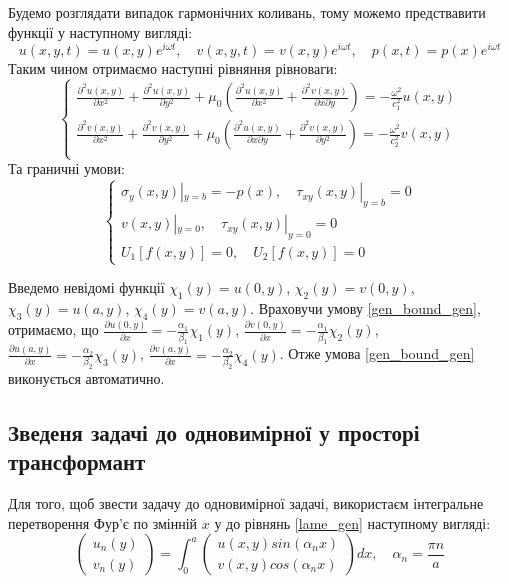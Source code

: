 Будемо розглядати випадок гармонічних коливань, тому можемо предствавити функції у наступному вигляді:
\begin{equation}
    u(x,y,t) = u(x,y) e^{i \omega t}, \quad v(x,y,t) = v(x,y) e^{i \omega t}, \quad p(x,t) = p(x) e^{i \omega t}
\end{equation}
Таким чином отримаємо наступні рівняння рівноваги:
\begin{equation}\label{lame_gen}
    \begin{cases}
        \frac{\partial^2 u(x,y)}{\partial x^2} + \frac{\partial^2 u(x,y)}{\partial y^2} + \mu_0 (\frac{\partial^2 u(x,y)}{\partial x^2} + \frac{\partial^2 v(x,y)}{\partial x\partial y}) = -\frac{\omega^2}{c_1^2}  u(x,y) \\
        \frac{\partial^2 v(x,y)}{\partial x^2} + \frac{\partial^2 v(x,y)}{\partial y^2} + \mu_0 (\frac{\partial^2 u(x,y)}{\partial x \partial y} + \frac{\partial^2 v(x,y)}{\partial y^2}) = -\frac{\omega^2}{c_2^2} v(x,y) \\
    \end{cases}
\end{equation}
Та граничні умови:
\begin{equation}\label{bound_gen}
    \begin{cases}
        \sigma_y(x, y) |_{y=b} = -p(x), \quad  \tau_{xy}(x,y) |_{y=b} =0 \\
        v(x,y) |_{y=0}, \quad \tau_{xy}(x,y) |_{y=0} =0 \\
        U_1[f(x,y)]=0, \quad U_2[f(x,y)]=0
    \end{cases}
\end{equation}

Введемо невідомі функції $\chi_1(y) = u(0, y)$, $\chi_2(y) = v(0, y)$, $\chi_3(y) = u(a, y)$, $\chi_4(y) = v(a, y)$.
Враховучи умову \eqref{gen_bound_gen}, отримаємо, що 
$\frac{\partial u(0, y)}{\partial x}=-\frac{\alpha_1}{\beta_1} \chi_1(y)$,
$\frac{\partial v(0, y)}{\partial x}=-\frac{\alpha_1}{\beta_1} \chi_2(y)$,
$\frac{\partial u(a, y)}{\partial x}=-\frac{\alpha_2}{\beta_2} \chi_3(y)$,
$\frac{\partial v(a, y)}{\partial x}=-\frac{\alpha_2}{\beta_2} \chi_4(y)$.
Отже умова \eqref{gen_bound_gen} виконується автоматично.

\subsection{Зведеня задачі до одновимірної у просторі трансформант}
Для того, щоб звести задачу до одновимірної задачі, використаєм інтегральне перетворення Фур'є по змінній $x$ у до рівнянь \eqref{lame_gen} наступному вигляді:
\begin{equation}
    \begin{pmatrix}
        u_n(y) \\
        v_n(y)
    \end{pmatrix} = \int_{0}^{a} 
    \begin{pmatrix}
        u(x,y) sin(\alpha_n x) \\
        v(x,y) cos(\alpha_n x)
    \end{pmatrix} dx, \quad \alpha_n = \frac{\pi n}{a}
\end{equation}

